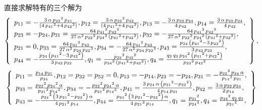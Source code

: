 直接求解特有的三个解为
\begin{equation}
\def\arraystretch{1.2}
\left\{
\begin{array}{l}
{{p}_{11}}=-\frac{3\,\alpha\,{{{p}_{22}}}^{2}\,{{p}_{41}}}{\left( 4\,{{{p}_{41}}}^{2}+4\,{{{p}_{42}}}^{2}\right) },
{{p}_{12}}=\frac{3\,\alpha\,{{{p}_{22}}}^{2}\,{{p}_{42}}}{\left( 4\,{{{p}_{41}}}^{2}+4\,{{{p}_{42}}}^{2}\right) },
{{p}_{13}}=-\frac{3\,\alpha\,{{p}_{22}}\,{{p}_{24}}}{4\,{{p}_{42}}},
{{p}_{14}}=\frac{3\,\alpha\,{{p}_{22}}\,{{p}_{24}}}{4\,{{p}_{42}}},\\ 
{{p}_{23}}=-{{p}_{24}},
{{p}_{31}}=\frac{64\,{{{p}_{41}}}^{3}\,{{{p}_{42}}}^{2}}{27\,{\alpha}^{2}\,{{{p}_{22}}}^{2}\,{{{p}_{24}}}^{2}\,\left( {{{p}_{41}}}^{2}+{{{p}_{42}}}^{2}\right) },
{{p}_{32}}=-\frac{64\,{{{p}_{41}}}^{2}\,{{{p}_{42}}}^{3}}{27\,{\alpha}^{2}\,{{{p}_{22}}}^{2}\,{{{p}_{24}}}^{2}\,\left( {{{p}_{41}}}^{2}+{{{p}_{42}}}^{2}\right) },\\ 
{{p}_{21}}=0,
{{p}_{33}}=\frac{64\,{{{p}_{41}}}^{2}\,{{p}_{42}}}{27\,{\alpha}^{2}\,{{p}_{24}}\,{{{p}_{22}}}^{3}},
{{p}_{34}}=-\frac{64\,{{{p}_{41}}}^{2}\,{{p}_{42}}}{27\,{\alpha}^{2}\,{{p}_{24}}\,{{{p}_{22}}}^{3}},
{{p}_{43}}=\frac{{{p}_{24}}\,\left( {{{p}_{41}}}^{2}-3\,{{{p}_{42}}}^{2}\right) }{3\,{{p}_{42}}\,{{p}_{22}}},\\ 
{{p}_{44}}=-\frac{{{p}_{24}}\,\left( {{{p}_{41}}}^{2}-3\,{{{p}_{42}}}^{2}\right) }{3\,{{p}_{42}}\,{{p}_{22}}},
{{q}_{1}}=\frac{{{{p}_{22}}}^{2}\,{{{p}_{42}}}^{2}}{{{{p}_{24}}}^{2}\,\left( {{{p}_{41}}}^{2}+{{{p}_{42}}}^{2}\right) },
{{q}_{4}}=\frac{{{q}_{2}}\,{{q}_{3}}\,{{{p}_{24}}}^{2}\,\left( {{{p}_{41}}}^{2}+{{{p}_{42}}}^{2}\right) }{{{{p}_{22}}}^{2}\,{{{p}_{42}}}^{2}}
\end{array}
\right\} ,
\end{equation}
\begin{equation}
\def\arraystretch{1.2}
\left\{
\begin{array}{l}
{{p}_{11}}=\frac{{{p}_{14}}\,{{p}_{21}}}{{{p}_{24}}},
p_{12}=p_{32}=p_{52}=0,
{{p}_{13}}=-{{p}_{14}},
{{p}_{23}}=-{{p}_{24}},
{{p}_{31}}=-\frac{{{{p}_{22}}}^{2}\,{{p}_{24}}\,\alpha}{{{{p}_{14}}}^{3}\,{{p}_{21}}},\\ 
{{p}_{33}}=\frac{{{{p}_{22}}}^{2}\,{{{p}_{24}}}^{2}\,\alpha}{{{{p}_{21}}}^{2}\,{{{p}_{14}}}^{3}},
{{p}_{34}}=-\frac{{{{p}_{22}}}^{2}\,{{{p}_{24}}}^{2}\,\alpha}{{{{p}_{21}}}^{2}\,{{{p}_{14}}}^{3}},
{{p}_{41}}=\frac{3\,{{p}_{24}}\,\alpha\,\left( {{{p}_{21}}}^{2}-{{{p}_{22}}}^{2}\right) }{4\,{{p}_{14}}\,{{p}_{21}}},
{{p}_{42}}=\frac{3\,\alpha\,{{p}_{22}}\,{{p}_{24}}}{2\,{{p}_{14}}},\\ 
{{p}_{43}}=-\frac{{{{p}_{24}}}^{2}\,\left( 3\,{{{p}_{21}}}^{2}-{{{p}_{22}}}^{2}\right) \,\alpha}{4\,{{{p}_{21}}}^{2}\,{{p}_{14}}},
{{p}_{44}}=\frac{{{{p}_{24}}}^{2}\,\left( 3\,{{{p}_{21}}}^{2}-{{{p}_{22}}}^{2}\right) \,\alpha}{4\,{{{p}_{21}}}^{2}\,{{p}_{14}}},
{{q}_{1}}=\frac{{{{p}_{21}}}^{2}}{{{{p}_{24}}}^{2}},
{{q}_{4}}=\frac{{{{p}_{24}}}^{2}\,{{q}_{2}}\,{{q}_{3}}}{{{{p}_{21}}}^{2}},
\end{array}
\right\}
\end{equation}
